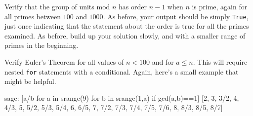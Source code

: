 %
\begin{sageverbatim}\end{sageverbatim}
%
%
Verify that the group of units mod $n$ has order $n-1$ when $n$ is prime, again for all primes between $100$ and $1000$.  As before, your output should be simply \verb?True?, just once indicating that the statement about the order is true for all the primes examined.  As before, build up your solution slowly, and with a smaller range of primes in the beginning.
\begin{sageverbatim}\end{sageverbatim}
%
%
Verify Euler's Theorem for all values of $n<100$ and for $a \leq n$.  This will require nested \verb?for? statements with a conditional.  Again, here's a small example that might be helpful.
%
\begin{sageexample}
sage: [a/b for a in srange(9) for b in srange(1,a) if gcd(a,b)==1]
[2, 3, 3/2, 4, 4/3, 5, 5/2, 5/3, 5/4, 6, 6/5,
 7, 7/2, 7/3, 7/4, 7/5, 7/6, 8, 8/3, 8/5, 8/7]
\end{sageexample}
%
\begin{sageverbatim}\end{sageverbatim}
%

